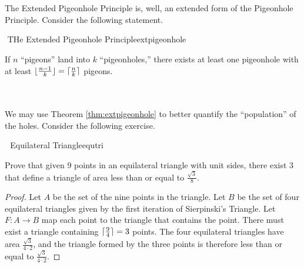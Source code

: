     \vphantom
    \\
    \\
    The Extended Pigeonhole Principle is, well, an extended form of the Pigeonhole Principle. Consider the following statement.
    \begin{theorem}{\Stop\,\,THe Extended Pigeonhole Principle}{extpigeonhole}
    
        If \(n\) ``pigeons'' land into \(k\) ``pigeonholes,'' there exists at least one pigeonhole with at least \(\lfloor\frac{n-1}{k}\rfloor=\lceil\frac{n}{k}\rceil\) pigeons.
    
    \end{theorem}
    \vphantom
    \\
    \\
    We may use Theorem \ref{thm:extpigeonhole} to better quantify the ``population'' of the holes. Consider the following exercise.
    \begin{exercise}{\Difficulty\,\Difficulty\,\Difficulty\,\,Equilateral Triangle}{equtri}
    
        Prove that given \(9\) points in an equilateral triangle with unit sides, there exist \(3\) that define a triangle of area less than or equal to \(\frac{\sqrt{3}}{8}\).
        \begin{proof}
            Let \(A\) be the set of the nine points in the triangle. Let \(B\) be the set of four equilateral triangles given by the first iteration of Sierpinski's Triangle. Let \(F:A\to B\) map each point to the triangle that contains the point. There must exist a triangle containing \(\lceil\frac{9}{4}\rceil=3\) points. The four equilateral triangles have area \(\frac{\sqrt{3}}{4\cdot2}\), and the triangle formed by the three points is therefore less than or equal to \(\frac{\sqrt{3}}{4\cdot2}\).
        \end{proof}
    
    \end{exercise}